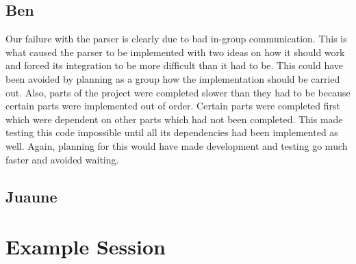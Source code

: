 \documentclass{article}
\begin{document}
\subsection{Ben}Our failure with the parser is clearly due to bad in-group communication. This is what caused the
parser to be implemented with two ideas on how it should work and forced its integration to be more difficult than
it had to be. This could have been avoided by planning as a group how the implementation should be carried out. Also,
parts of the project were completed slower than they had to be because certain parts were implemented out of order.
Certain parts were completed first which were dependent on other parts which had not been completed. This made testing
this code impossible until all its dependencies had been implemented as well. Again, planning for this would have made
development and testing go much faster and avoided waiting. 


\subsection{Juaune}

\section{Example Session}
\end{document}
